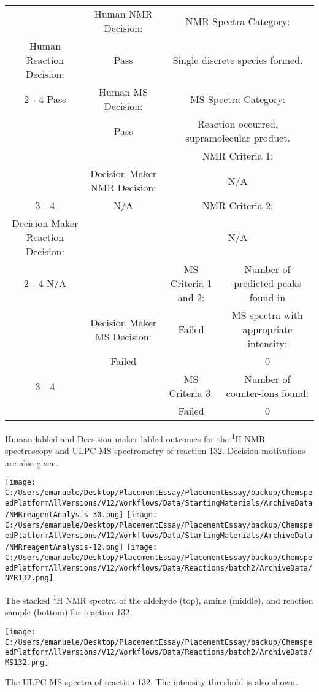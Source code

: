 \documentclass{article}%
\begin{document}
\begin{Decision Table}[H]%
\begin{tabular}{|c|c|c|c|}%
\hline%
&Human NMR Decision:&\multicolumn{2}{|c|}{NMR Spectra Category:}\\%
Human Reaction Decision:&Pass&\multicolumn{2}{|c|}{Single discrete species formed.}\\%
\cline{2%
-%
4}%
Pass&Human MS Decision:&\multicolumn{2}{|c|}{MS Spectra Category:}\\%
&Pass&\multicolumn{2}{|c|}{Reaction occurred, supramolecular product.}\\%
\hline%
&&\multicolumn{2}{|c|}{NMR Criteria 1:}\\%
&Decision Maker NMR Decision:&\multicolumn{2}{|c|}{N/A}\\%
\cline{3%
-%
4}%
&N/A&\multicolumn{2}{|c|}{NMR Criteria 2:}\\%
Decision Maker Reaction Decision:&&\multicolumn{2}{|c|}{N/A}\\%
\cline{2%
-%
4}%
N/A&&MS Criteria 1 and 2:&Number of predicted peaks found in\\%
&Decision Maker MS Decision:&Failed&MS spectra with appropriate intensity:\\%
&Failed&&0\\%
\cline{3%
-%
4}%
&&MS Criteria 3:&Number of counter{-}ions found:\\%
&&Failed&0\\%
\hline%
\end{tabular}%
\caption{Human labled and Decsision maker labled outcomes for the \textsuperscript{1}H NMR spectroscopy and ULPC-MS spectrometry of reaction 132. Decision motivations are also given.}%
\end{Decision Table}%
\begin{NMR Spectra}[H]%
\begin{center}%
\texttt{[image: C:/Users/emanuele/Desktop/PlacementEssay/PlacementEssay/backup/ChemspeedPlatformAllVersions/V12/Workflows/Data/StartingMaterials/ArchiveData/NMRreagentAnalysis-30.png]}\hfill%
\texttt{[image: C:/Users/emanuele/Desktop/PlacementEssay/PlacementEssay/backup/ChemspeedPlatformAllVersions/V12/Workflows/Data/StartingMaterials/ArchiveData/NMRreagentAnalysis-12.png]}\hfill%
\texttt{[image: C:/Users/emanuele/Desktop/PlacementEssay/PlacementEssay/backup/ChemspeedPlatformAllVersions/V12/Workflows/Data/Reactions/batch2/ArchiveData/NMR132.png]}\hfill%
\end{center}%
\caption{The stacked \textsuperscript{1}H NMR spectra of the aldehyde (top), amine (middle), and reaction sample (bottom) for reaction 132.}%
\end{NMR Spectra}%
\begin{MS Spectra}[H]%
\begin{center}%
\texttt{[image: C:/Users/emanuele/Desktop/PlacementEssay/PlacementEssay/backup/ChemspeedPlatformAllVersions/V12/Workflows/Data/Reactions/batch2/ArchiveData/MS132.png]}\hfill%
\end{center}%
\caption{The ULPC-MS spectra of reaction 132. The intensity threshold is also shown.}%
\end{MS Spectra}%
\end{document}
